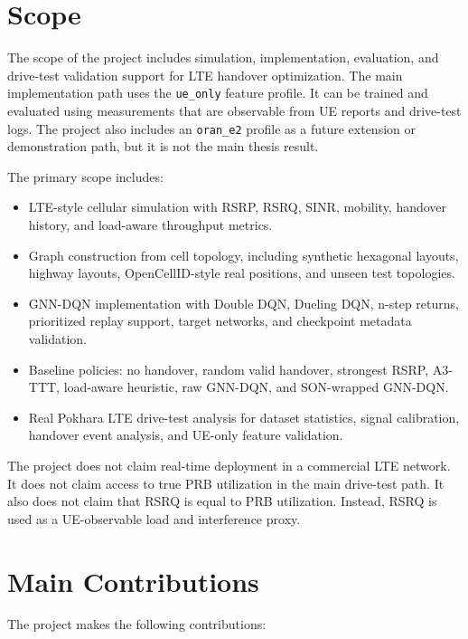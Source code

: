 \documentclass[12pt,a4paper]{report}
\newcommand{\ueonly}{\texttt{ue\_only}}
\newcommand{\orane}{\texttt{oran\_e2}}
\begin{document}
\section{Scope}
The scope of the project includes simulation, implementation, evaluation, and drive-test validation support for LTE handover optimization. The main implementation path uses the \ueonly{} feature profile. It can be trained and evaluated using measurements that are observable from UE reports and drive-test logs. The project also includes an \orane{} profile as a future extension or demonstration path, but it is not the main thesis result.

The primary scope includes:
\begin{itemize}
    \item LTE-style cellular simulation with RSRP, RSRQ, SINR, mobility, handover history, and load-aware throughput metrics.
    \item Graph construction from cell topology, including synthetic hexagonal layouts, highway layouts, OpenCellID-style real positions, and unseen test topologies.
    \item GNN-DQN implementation with Double DQN, Dueling DQN, n-step returns, prioritized replay support, target networks, and checkpoint metadata validation.
    \item Baseline policies: no handover, random valid handover, strongest RSRP, A3-TTT, load-aware heuristic, raw GNN-DQN, and SON-wrapped GNN-DQN.
    \item Real Pokhara LTE drive-test analysis for dataset statistics, signal calibration, handover event analysis, and UE-only feature validation.
\end{itemize}

The project does not claim real-time deployment in a commercial LTE network. It does not claim access to true PRB utilization in the main drive-test path. It also does not claim that RSRQ is equal to PRB utilization. Instead, RSRQ is used as a UE-observable load and interference proxy.

\section{Main Contributions}
The project makes the following contributions:
\end{document}
